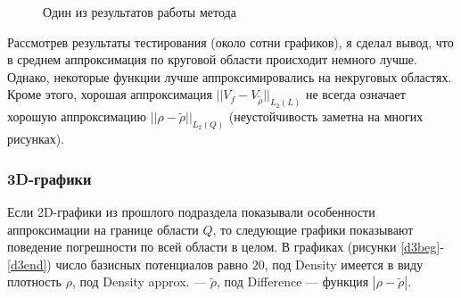 \documentclass[a4paper]{article}
\begin{document}
                  \begin{figure}[h] 
                    \vfill 
                    \caption{Один из результатов работы метода} 
                    \label{hexampl} 
                    \end{figure}                                        

Рассмотрев результаты тестирования (около сотни графиков), я сделал вывод, что в среднем аппроксимация по круговой области происходит немного лучше.
Однако, некоторые функции лучше аппроксимировались на некруговых областях.
Кроме этого, хорошая аппроксимация $||V_f-V_{\tilde{\rho} } ||_{L_2(L)}$ не всегда означает хорошую аппроксимацию $||\rho-\tilde{\rho} ||_{L_2(Q)}$ (неустойчивость заметна на многих рисунках).%

\FloatBarrier 
\subsubsection{3D-графики}
Если 2D-графики из прошлого подраздела показывали особенности аппроксимации на границе области $Q$, то следующие графики показывают поведение погрешности по всей области в целом.
В графиках (рисунки \ref{d3beg}-\ref{d3end}) число базисных потенциалов равно $20$, под Density имеется в виду плотность $\rho$, под Density approx. --- $\tilde{\rho}$, под Difference --- функция $|\rho-\tilde{\rho}|$.
\end{document}
